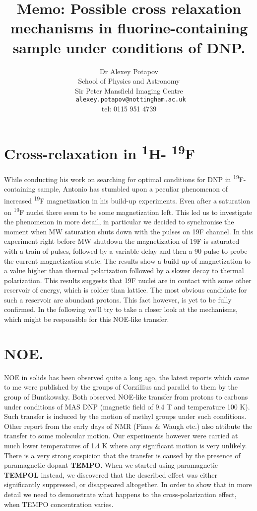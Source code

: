 \documentclass[a4paper, 12pt]{article}
\begin{document}
\title{Memo: Possible cross relaxation mechanisms in fluorine-containing sample under conditions of DNP.}
\author{Dr Alexey Potapov\\
School of Physics and Astronomy\\
Sir Peter Mansfield Imaging Centre \\
\texttt{ alexey.potapov@nottingham.ac.uk}\\
tel: 0115 951 4739 }
\maketitle
 
 
\section{Cross-relaxation in \textsuperscript{1}H- \textsuperscript{19}F  }
While conducting his work on searching for optimal conditions for DNP in  \textsuperscript{19}F-containing sample, Antonio has stumbled upon a peculiar phenomenon of increased \textsuperscript{19}F magnetization in his build-up experiments. Even after a saturation on \textsuperscript{19}F nuclei there seem to be some magnetization left. This led us to investigate the phenomenon in more detail, in particular we decided to synchronise the moment when MW saturation shuts down with the pulses on 19F channel.
In this experiment right before MW shutdown the magnetization of 19F is saturated with a train of pulses, followed by a variable delay and then a 90 pulse to probe the current magnetization state. The results show a build up of magnetization to a value higher than thermal polarization followed by a slower decay to thermal polarization. This results suggests that 19F nuclei are in contact with some other reservoir of energy, which is colder than lattice. The most obvious candidate for such a reservoir are abundant protons. This fact however, is yet to be fully confirmed.  
In the following we'll try to take a closer look at the mechanisms, which might be responsible for this NOE-like transfer.
\section{NOE.}
NOE in solids has been observed quite a long ago, the latest reports which came to me were published by the groups of Corzillius and parallel to them by the group of Buntkowsky. Both observed NOE-like transfer from protons to carbons under conditions of MAS DNP (magnetic field of 9.4 T and temperature 100 K). Such transfer is induced by the motion of methyl groups under such conditions. Other report from the early days of NMR (Pines \& Waugh etc.) also attibute the transfer to some molecular motion. Our experiments however were carried at much lower temperatures of 1.4 K where any significant motion is very unlikely. 
There is a very strong suspicion that the transfer is caused by the presence of paramagnetic dopant \textbf{TEMPO}. When we started using paramagnetic \textbf{TEMPOL} instead, we discovered that the described effect was either significantly suppressed, or disappeared altogether. In order to show that in more detail we need to demonstrate what happens to the cross-polarization effect, when TEMPO concentration varies.
\end{document}

